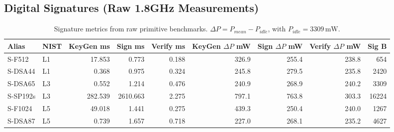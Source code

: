 \subsection{Digital Signatures (Raw 1.8GHz Measurements)}
\begin{table}[t]
\centering
\caption{Signature metrics from raw primitive benchmarks. $\Delta P = P_{mean} - P_{idle}$, with $P_{idle}=3309\,\mathrm{mW}$.}
\footnotesize
\setlength{\tabcolsep}{3pt}
\begin{tabular}{@{}llrrrrrrr@{}}\toprule
Alias & NIST & KeyGen ms & Sign ms & Verify ms & KeyGen $\Delta P$ mW & Sign $\Delta P$ mW & Verify $\Delta P$ mW & Sig B \\ \midrule
S-F512 & L1 & 17.853 & 0.773 & 0.188 & 326.9 & 255.4 & 238.8 & 654 \\
S-DSA44 & L1 & 0.368 & 0.975 & 0.324 & 245.8 & 279.5 & 235.8 & 2420 \\
S-DSA65 & L3 & 0.552 & 1.214 & 0.476 & 240.9 & 268.9 & 240.2 & 3309 \\
S-SP192s & L3 & 282.539 & 2610.663 & 2.275 & 797.1 & 763.8 & 303.3 & 16224 \\
S-F1024 & L5 & 49.018 & 1.441 & 0.275 & 439.3 & 250.4 & 240.0 & 1267 \\
S-DSA87 & L5 & 0.739 & 1.657 & 0.718 & 227.0 & 268.1 & 235.2 & 4627 \\
\bottomrule\end{tabular}
\label{tab:res-sig-manual}
\end{table}

